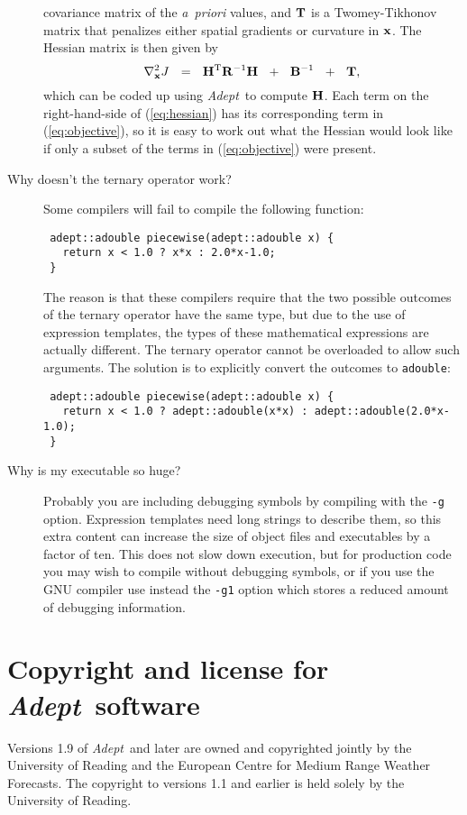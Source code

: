 \documentclass[a4,oneside]{book}
\def\codesize{\small}
\def\x{\ensuremath{{\bf x}}}
\def\Adept{\emph{Adept}}
\def\code#1{{\codesize\texttt{#1}}}
\begin{document}
\begin{description}
  covariance matrix of the \emph{a~priori} values, and ${\bf T}$ is a
  Twomey-Tikhonov matrix that penalizes either spatial gradients or
  curvature in $\x$.  The Hessian matrix is then given by
\begin{equation}
\nabla_\x^2J \myspace=\myspace {\bf H}^\mathrm{T}{\bf
  R}^{-1}{\bf H}\nonumber
\myspace+\myspace {\bf B}^{-1} \myspace+\myspace {\bf T},
\label{eq:hessian}
\end{equation}
  which can be coded up using \Adept\ to compute ${\bf H}$. Each term
  on the right-hand-side of (\ref{eq:hessian}) has its corresponding
  term in (\ref{eq:objective}), so it is easy to work out what the
  Hessian would look like if only a subset of the terms in
  (\ref{eq:objective}) were present.
\item[Why doesn't the ternary operator work?] Some compilers will fail
  to compile the following function:
\begin{lstlisting}
 adept::adouble piecewise(adept::adouble x) {
   return x < 1.0 ? x*x : 2.0*x-1.0;
 }
\end{lstlisting}%
The reason is that these compilers require that the two possible
outcomes of the ternary operator have the same type, but due to the
use of expression templates, the types of these mathematical
expressions are actually different.  The ternary operator cannot be
overloaded to allow such arguments. The solution is to explicitly
convert the outcomes to \code{adouble}:
\begin{lstlisting}
 adept::adouble piecewise(adept::adouble x) {
   return x < 1.0 ? adept::adouble(x*x) : adept::adouble(2.0*x-1.0);
 }
\end{lstlisting}
\item[Why is my executable so huge?]  Probably you are including
  debugging symbols by compiling with the \code{-g} option. Expression
  templates need long strings to describe them, so this extra content
  can increase the size of object files and executables by a factor of
  ten.  This does not slow down execution, but for production code you
  may wish to compile without debugging symbols, or if you use the GNU
  compiler use instead the \code{-g1} option which stores a reduced
  amount of debugging information.
\end{description}

\section{Copyright and license for \Adept\ software}
\label{sec:license}
Versions 1.9 of \Adept\ and later are owned and copyrighted jointly by
the University of Reading and the European Centre for Medium Range
Weather Forecasts. The copyright to versions 1.1 and earlier is held
solely by the University of Reading.
\end{document}
